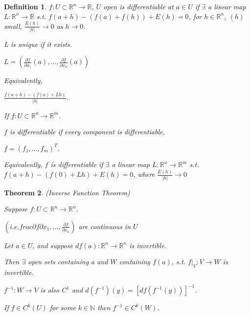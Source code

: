 \documentclass[twoside]{article}
\newcounter{lecnum}
\newcommand{\N}{\mathbb{N}}
\newtheorem{theorem}{Theorem}[lecnum]
\newtheorem{definition}[theorem]{Definition}
\newcommand\R{\mathbb{R}}
\begin{document}
    \begin{definition}
        $f: U \subset \R^n \rightarrow \R$, $U$ open is differentiable at $a \in U$ if $\exists$ a linear map $L:\R^n \rightarrow \R$ s.t. $f(a+h) - (f(a) + f(h)) + E(h) = 0$, for $h \in \R^n$, $(h)$ small, $\frac{E(h)}{|h|} \rightarrow 0$ as $h \rightarrow 0$. 

        L is unique if it exists. 

        $L = (\frac{\partial f}{\partial x_1}(a), \dots, \frac{\partial f}{\partial x_n}(a))$

        Equivalently, 

        $\frac{f(a+h) - (f(a) + L h)}{|h|}$.

        If $f: U \subset \R^n \rightarrow \R^m$. 

        $f$ is differentiable if every component is differentiable, 

        $f = (f_1, \dots, f_m)^T$. 

        Equivalently, $f$ is differentiable if $\exists$ a linear map $L:\R^n \rightarrow \R^m$ s.t. $f(a+h) - (f(0) + Lh) + E(h) = 0$, where $\frac{E(h)}{|h|} \rightarrow 0$
    \end{definition}


    \begin{theorem}
        (Inverse Function Theorem)

        Suppose $f:U\subset \R^n \rightarrow \R^n$. 

        $(i.e. frac{\partial f}{\partial x_1}, \dots, \frac{\partial f}{\partial x_n})$ are continuous in $U$
    
        Let $a \in U$, and suppose $df(a): \R^n \rightarrow \R^n$ is invertible. 

        Then $\exists$ open sets containing a and $W$ containing $f(a)$, s.t. $f\vert_V:V\rightarrow W$ is invertible. 

        $f^{-1}: W \rightarrow V$ is also $C^1$ and $d(f^{-1})(y) = [df(f^{-1}(y))]^{-1}$.

        If $f \in C^k(U)$ for some $k \in \N$ then $f^{-1} \in C^k(W)$. 

    \end{theorem}
\end{document}
